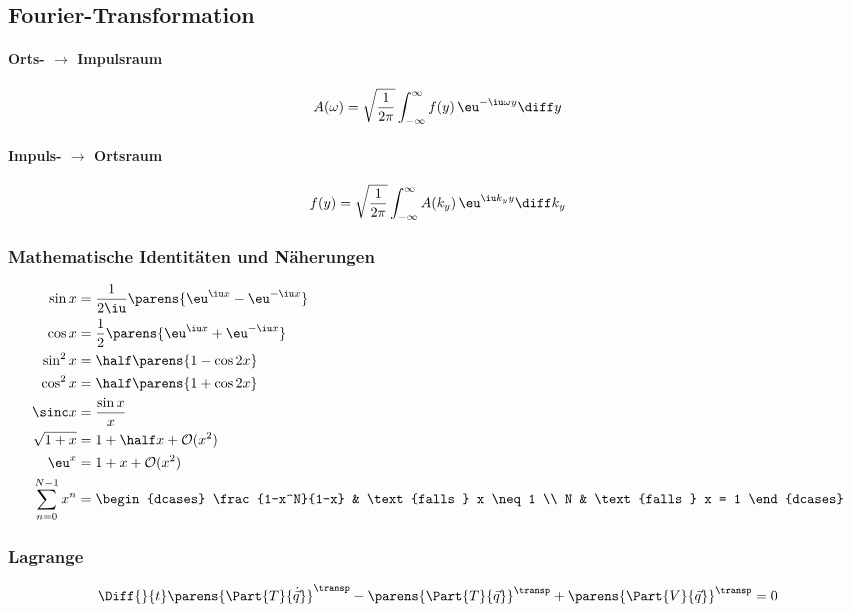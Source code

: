 	
	\subsection{Fourier-Transformation} %
		\paragraph{Orts- $\rightarrow$ Impulsraum} %
			\[
				A(\omega) = \sqrt{\frac{1}{2\pi}} \int_{-\infty}^{\infty} f(y) \, \eu^{-\iu \omega y} \diff y
			\]
		\paragraph{Impuls- $\rightarrow$ Ortsraum} %
			\[
				f(y) = \sqrt{\frac{1}{2\pi}} \int_{-\infty}^{\infty} A(k_y) \, \eu^{\iu k_y y} \diff k_y
			\]

	\subsubsection{Mathematische Identitäten und Näherungen} %
		\begin{align*}
			\sin x &= \frac{1}{2\iu} \parens{\eu^{\iu x} - \eu^{-\iu x}} \\
			\cos x &= \frac{1}{2} \parens{\eu^{\iu x} + \eu^{-\iu x}} \\
			\sin^2 x &= \half \parens{1 - \cos 2x} \\
			\cos^2 x &= \half \parens{1 + \cos 2x} \\
			\sinc x &= \frac{\sin x}{x} \\
			\sqrt{1 + x} &= 1 + \half x + \mathcal O (x^2) \\
			\eu^x &= 1 + x + \mathcal O (x^2) \\
			\sum_{n=0}^{N-1} x^n &= \begin{dcases}
				\frac{1-x^N}{1-x} & \text{falls } x \neq 1 \\
				N & \text{falls } x = 1
			\end{dcases}
		\end{align*}

	\subsubsection{Lagrange} %
		\[
			\Diff{}{t} \parens{\Part{T}{\dot{\vec q}}}^\transp
				- \parens{\Part{T}{\vec q}}^\transp + \parens{\Part{V}{\vec q}}^\transp
				= 0
		\]

